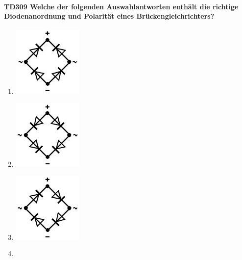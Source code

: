 \documentclass[8pt]{article}
\begin{document}
\begin{enumerate}
\begin{enumerate}[nolistsep,label=\Alph*]
\paragraph*{TD309 Welche der folgenden Auswahlantworten enthält die richtige Diodenanordnung und Polarität eines Brückengleichrichters?}
\begin{enumerate}[nolistsep,label=\Alph*]
\item
\begin{center}
	\begin{minipage}{\linewidth}
		\centering
		\includegraphics[scale=1.0]{pics/td309_a.jpg}
	\end{minipage}
\end{center}
\item
\begin{center}
	\begin{minipage}{\linewidth}
		\centering
		\includegraphics[scale=1.0]{pics/td309_b.jpg}
	\end{minipage}
\end{center}
\item
\begin{center}
	\begin{minipage}{\linewidth}
		\centering
		\includegraphics[scale=1.0]{pics/td309_c.jpg}
	\end{minipage}
\end{center}
\item
\begin{center}

\end{center}
\end{enumerate}
\end{enumerate}
\end{enumerate}
\end{document}
